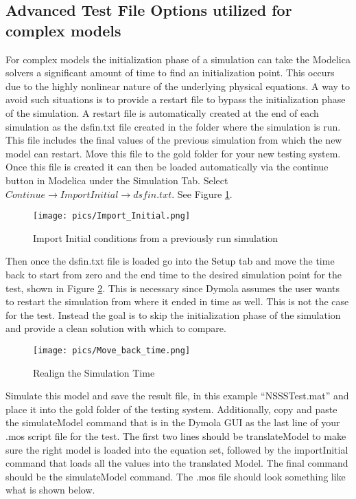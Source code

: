 \subsection{Advanced Test File Options utilized for complex models}
For complex models the initialization phase of a simulation can take the Modelica solvers a significant amount of time to find an initialization point. This occurs due to the highly nonlinear nature of the underlying physical equations.  A way to avoid such situations is to provide a restart file to bypass the initialization phase of the simulation. A restart file is automatically created at the end of each simulation as the dsfin.txt file created in the folder where the simulation is run. This file includes the final values of the previous simulation from which the new model can restart.   Move this file to the gold folder for your new testing system.
Once this file is created it can then be loaded automatically via the continue button in Modelica under the Simulation Tab. Select $Continue \rightarrow  Import Initial  \rightarrow  dsfin.txt  $. See Figure \ref{import Initial}.

\begin{figure}[hbtp]
\centering
\texttt{[image: pics/Import\_Initial.png]}
\caption{Import Initial conditions from a previously run simulation}
\label{import Initial}
\end{figure}

Then once the dsfin.txt file is loaded go into the Setup tab and move the time back to start from zero and the end time to the desired simulation point for the test, shown in Figure \ref{Simulation Time Realignment}. This is necessary since Dymola assumes the user wants to restart the simulation from where it ended in time as well. This is not the case for the test. Instead the goal is to skip the initialization phase of the simulation and provide a clean solution with which to compare.

\begin{figure}[hbtp]
\centering
\texttt{[image: pics/Move\_back\_time.png]}
\caption{Realign the Simulation Time}
\label{Simulation Time Realignment}
\end{figure}

Simulate this model and save the result file, in this example “NSSS\textunderscore Test.mat” and place it into the gold folder of the testing system. Additionally, copy and paste the simulateModel command that is in the Dymola GUI as the last line of your .mos script file for the test. The first two lines should be translateModel to make sure the right model is loaded into the equation set, followed by the importInitial command that loads all the values into the translated Model. The final command should be the simulateModel command.
The .mos file should look something like what is shown below.

